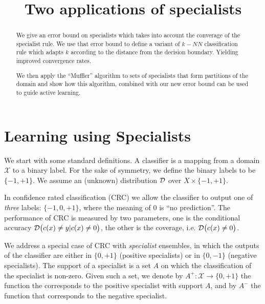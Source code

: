 \documentclass{colt2019} %
\newcommand{\D}{{\cal D}}
\newcommand{\cX}{\mathcal{X}}
\begin{document}
\title{Two applications of specialists}


\maketitle

\begin{abstract}
We give an error bound on specialists which takes into account the
converage of the specialist rule. We use that error bound to define a
variant of $k-NN$ classification rule which adapts $k$ according to
the distance from the decision boundary. Yielding improved convergence
rates.

We then apply the ``Muffler'' algorithm to sets of specialists that
form partitions of the domain and show how this algorithm, combined
with our new error bound can be used to guide active learning.
\end{abstract}

\section{Learning using Specialists}

We start with some standard definitions. A classifier is a
mapping from a domain $\cX$ to a binary label. For the sake of symmetry,
we define the binary labels to be $\{-1,+1\}$. 
We assume an (unknown) distribution $\D$ over $X \times \{-1,+1\}$.

In confidence rated classification (CRC) we allow the classifier to
output one of {\em three} labels: $\{-1,0,+1\}$, where the meaning of
$0$ is ``no prediction''. The performance of CRC is measured by two
parameters, one is the conditional accuracy $\D\bigl(c(x) \neq y | c(x) \neq
0\bigr)$, the other is the coverage, i.e. $\D\bigl(c(x) \neq 0\bigr)$.

We address a special case of CRC with {\em specialist} ensembles, 
in which the outputs of the classifier are either in $\{0,+1\}$ (positive specialists) or in
$\{0,-1\}$ (negative specialists). 
The support of a specialist is a set $A$ on which the classification of
the specialist is non-zero. Given such a set, we denote by $A^+: \cX \to \{0,+1\}$ the
function the corresponds to the positive specialist with support $A$, and by $A^-$ the
function that corresponds to the negative specialist.
\end{document}
